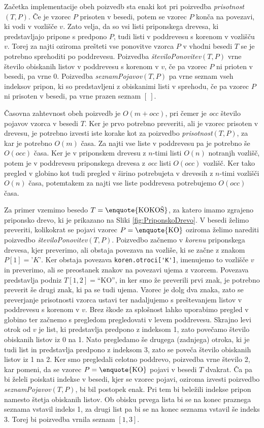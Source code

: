 Začetka implementacije obeh poizvedb sta enaki kot pri poizvedba \textit{prisotnost}$(T,P)$. Če je vzorec $P$ prisoten v besedi, potem se vzorec $P$ konča na povezavi, ki vodi v vozlišče $v$. Zato velja, da so vsi listi priponskega drevesa, ki predstavljajo pripone s predpono $P$, tudi listi v poddrevesu s korenom v vozlišču $v$. Torej za najti oziroma prešteti vse ponovitve vzorca $P$ v vhodni besedi $T$ se je potrebno sprehoditi po poddrevesu. Poizvedba \textit{številoPonovitev}$(T,P)$ vrne število obiskanih listov v poddrevesu s korenom v $v$, če pa vzorec $P$ ni prioten v besedi, pa vrne $0$. Poizvedba \textit{seznamPojavov}$(T,P)$ pa vrne seznam vseh indeksov pripon, ki so predstavljeni z obiskanimi listi v sprehodu, če pa vzorec $P$ ni prisoten v besedi, pa vrne prazen seznam $[~]$.

Časovna zahtevnost obeh poizvedb je $O(m+\textit{occ})$, pri čemer je \textit{occ} število pojavov vzorca v besedi $T$. Ker je prvo potrebno preveriti, ali je vzorec prisoten v drevesu, je potrebno izvesti iste korake kot za poizvedbo \textit{prisotnost}$(T,P)$, za kar je potrebno $O(m)$ časa. Za najti vse liste v poddrevesu pa je potrebno še $O(\textit{occ})$ časa. Ker je v priponskem drevesu z $n$-timi listi $O(n)$ notranjh vozlišč, potem je v poddrevesu priponskega drevesa z \textit{occ} listi $O(\textit{occ})$ vozlišč. Ker tako pregled v globino kot tudi pregled v širino potrebujeta v drevesih z $n$-timi vozlišči $O(n)$ časa, potemtakem za najti vse liste poddrevesa potrebujemo $O(\textit{occ})$ časa.

Za primer vzemimo besedo $T=\text{\enquote{KOKOŠ}}$, za katero imamo zgrajeno priponsko drevo, ki je prikazano na Sliki \ref{fig:PriponskoDrevo}. V besedi želimo preveriti, kolikokrat se pojavi vzorec $P=\text{\enquote{KO}}$ oziroma želimo narediti poizvedbo \textit{številoPonovitev}$(T,P)$. Poizvedbo začnemo v \textit{korenu} priponskega drevesa, kjer preverimo, ali obstaja povezava na vozliše, ki se začne z znakom $P[1]=\textit{'K'}$. Ker obstaja povezava \verb|koren.otroci['K']|, imenujemo to vozlišče $v$ in preverimo, ali se preostanek znakov na povezavi ujema z vzorcem. Povezava predstavlja podniz $T[1,2]=$\enquote{KO}, in ker smo že preverili prvi znak, je potrebno preverit še drugi znak, ki pa se tudi ujema. Vzorec je dolg dva znaka, zato se preverjanje prisotnosti vzorca ustavi ter nadaljujemo s preštevanjem listov v poddrevesu s korenom v $v$. Brez škode za splošnost lahko uporabimo pregled v globino ter začnemo s pregledom pregledovati v levem poddrevesu. Skrajno levi otrok od $v$ je list, ki predstavlja predpono z indeksom 1, zato povečamo število obiskanih listov iz 0 na 1. Nato pregledamo še drugega (zadnjega) otroka, ki je tudi list in predstavlja predpono z indeksom 3, zato se poveča število obiskanih listov iz 1 na 2. Ker smo pregledali celotno poddrevo, poizvedba vrne število 2, kar pomeni, da se vzorec $P=\text{\enquote{KO}}$ pojavi v besedi $T$ dvakrat. Ča pa bi želeli poiskati indekse v besedi, kjer se vzorec pojavi, oziroma izvesti poizvedbo \textit{seznamPojavov}$(T,P)$, bi bil postopek enak. Pri tem bi beležili indekse pripon namesto štetja obiskanih listov. Ob obisku prvega lista bi se na konec praznega seznama vstavil indeks 1, za drugi list pa bi se na konec seznama vstavil še indeks 3. Torej bi poizvedba vrnila seznam $[1,3]$.